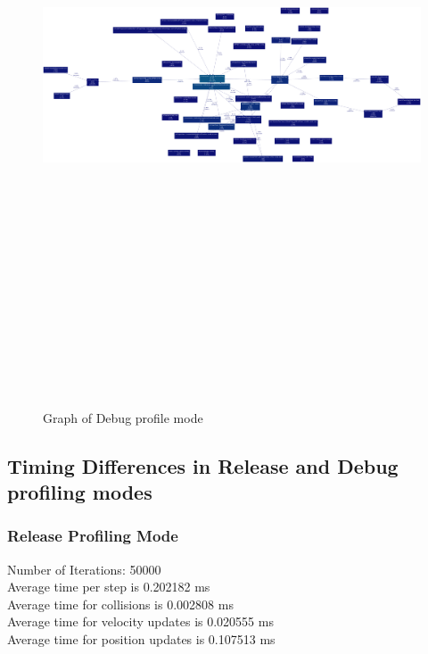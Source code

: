 \documentclass[11pt]{article}
\begin{document}
\begin{figure}[H]
\centering
\includegraphics[height=19cm,width=19cm]{debug.png}
\caption{Graph of Debug profile mode}
\end{figure}

\subsection{Timing Differences in Release and Debug profiling modes}
\subsubsection{Release Profiling Mode}
Number of Iterations: 50000 \\
Average time per step is 0.202182 ms \\
Average time for collisions is 0.002808 ms \\
Average time for velocity updates is 0.020555 ms \\
Average time for position updates is 0.107513 ms
\end{document}
